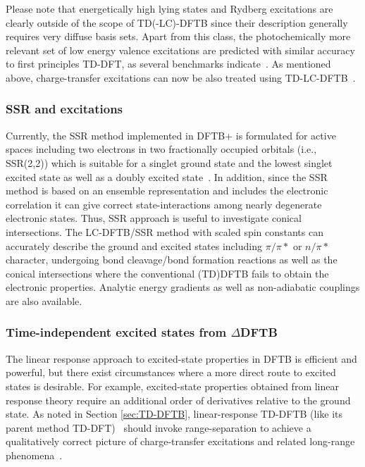 \documentclass[reprint,onecolumn,superscriptaddress]{revtex4-1}
\newcommand{\dftbp}{DFTB+}
\begin{document}
Please note that energetically high lying states and Rydberg excitations are
clearly outside of the scope of TD(-LC)-DFTB since their description generally
requires very diffuse basis sets. Apart from this class, the photochemically
more relevant set of low energy valence excitations are predicted with similar
accuracy to first principles TD-DFT, as several benchmarks
indicate~\cite{trani2011time,Dominguez2013,fihey2019performances}. As mentioned
above, charge-transfer excitations can now be also treated using
TD-LC-DFTB~\cite{Kranz2017}.

\subsubsection{SSR and excitations}
\label{para:ssrxc}

Currently, the SSR method implemented in \dftbp{} is formulated for active
spaces including two electrons in two fractionally occupied orbitals (i.e.,
SSR(2,2)) which is suitable for a singlet ground state and the lowest singlet
excited state as well as a doubly excited state~\cite{Lee19}. In addition, since
the SSR method is based on an ensemble representation and includes the
electronic correlation it can give correct state-interactions among nearly
degenerate electronic states. Thus, SSR approach is useful to investigate
conical intersections. The LC-DFTB/SSR method with scaled spin constants can
accurately describe the ground and excited states including $\pi/\pi*$ or
$n/\pi*$ character, undergoing bond cleavage/bond formation reactions as well as
the conical intersections where the conventional (TD)DFTB fails to obtain the
electronic properties. Analytic energy gradients as well as non-adiabatic
couplings are also available.


\subsubsection{Time-independent excited states from $\Delta$DFTB}

The linear response approach to excited-state properties in DFTB is efficient
and powerful, but there exist circumstances where a more direct route to excited
states is desirable. For example, excited-state properties obtained from linear
response theory require an additional order of derivatives relative to the
ground state. As noted in Section \ref{sec:TD-DFTB}, linear-response TD-DFTB
(like its parent method TD-DFT)~\cite{Dreuw2004} should invoke range-separation
to achieve a qualitatively correct picture of charge-transfer excitations and
related long-range phenomena~\cite{Kranz2017}.
\end{document}
